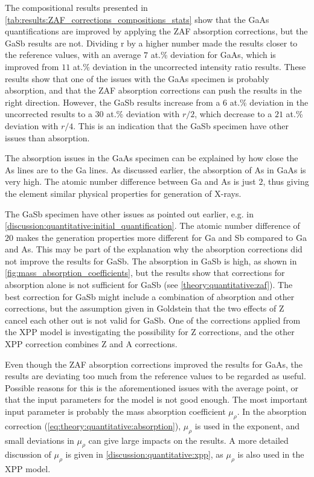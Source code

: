 The compositional results presented in \cref{tab:results:ZAF_corrections_compositions_stats} show that the GaAs quantifications are improved by applying the ZAF absorption corrections, but the GaSb results are not.
Dividing r by a higher number made the results closer to the reference values, with an average $7$ at.\% deviation for GaAs, which is improved from $11$ at.\% deviation in the uncorrected intensity ratio results.
These results show that one of the issues with the GaAs specimen is probably absorption, and that the ZAF absorption corrections can push the results in the right direction.
However, the GaSb results increase from a $6$ at.\% deviation in the uncorrected results to a $30$ at.\% deviation with $r/2$, which decrease to a $21$ at.\% deviation with $r/4$.
This is an indication that the GaSb specimen have other issues than absorption.


The absorption issues in the GaAs specimen can be explained by how close the As lines are to the Ga lines.
As discussed earlier, the absorption of As in GaAs is very high.
The atomic number difference between Ga and As is just $2$, thus giving the element similar physical properties for generation of X-rays.


The GaSb specimen have other issues as pointed out earlier, e.g. in \cref{discussion:quantitative:initial_quantification}.
The atomic number difference of $20$ makes the generation properties more different for Ga and Sb compared to Ga and As.
This may be part of the explanation why the absorption corrections did not improve the results for GaSb.
The absorption in GaSb is high, as shown in \cref{fig:mass_absorption_coefficients}, but the results show that corrections for absorption alone is not sufficient for GaSb (see \cref{theory:quantitative:zaf}).
The best correction for GaSb might include a combination of absorption and other corrections, but the assumption given in Goldstein \cite[p. 300]{goldstein_scanning_2018} that the two effects of Z cancel each other out is not valid for GaSb.
One of the corrections applied from the XPP model is investigating the possibility for Z corrections, and the other XPP correction combines Z and A corrections.

Even though the ZAF absorption corrections improved the results for GaAs, the results are deviating too much from the reference values to be regarded as useful.
Possible reasons for this is the aforementioned issues with the average point, or that the input parameters for the model is not good enough.
The most important input parameter is probably the mass absorption coefficient $\mu_\rho$.
In the absorption correction (\cref{eq:theory:quantitative:absorption}), $\mu_\rho$ is used in the exponent, and small deviations in $\mu_\rho$ can give large impacts on the results.
A more detailed discussion of $\mu_\rho$ is given in \cref{discussion:quantitative:xpp}, as $\mu_\rho$ is also used in the XPP model.


